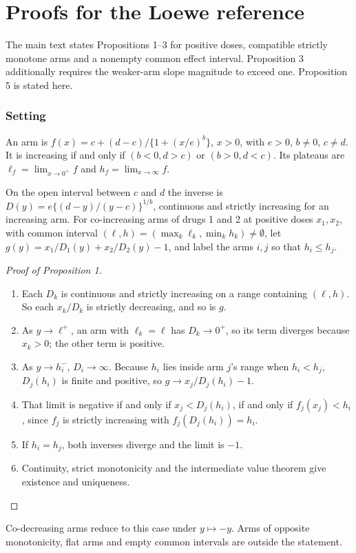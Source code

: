 \documentclass[11pt]{article}
\begin{document}
\section{Proofs for the Loewe reference}\label{sec:S9}
The main text states Propositions 1--3 for positive doses, compatible strictly monotone arms and a nonempty common effect interval. Proposition 3 additionally requires the weaker-arm slope magnitude to exceed one. Proposition 5 is stated here.
\subsubsection*{Setting} An arm is $f(x)=c+(d-c)/\{1+(x/e)^b\}$, $x>0$, with $e>0$, $b\neq0$, $c\neq d$. It is increasing if and only if $(b<0,d>c)$ or $(b>0,d<c)$. Its plateaus are $\ell_f=\lim_{x\to0^+}f$ and $h_f=\lim_{x\to\infty}f$.

On the open interval between $c$ and $d$ the inverse is $D(y)=e\{(d-y)/(y-c)\}^{1/b}$, continuous and strictly increasing for an increasing arm. For co-increasing arms of drugs 1 and 2 at positive doses $x_1,x_2$, with common interval $(\ell,h)=(\max_k\ell_k,\min_kh_k)\neq\emptyset$, let $g(y)=x_1/D_1(y)+x_2/D_2(y)-1$, and label the arms $i,j$ so that $h_i\le h_j$.

\begin{proof}[Proof of Proposition 1]
\begin{enumerate}
\item Each $D_k$ is continuous and strictly increasing on a range containing $(\ell,h)$. So each $x_k/D_k$ is strictly decreasing, and so is $g$.
\item As $y\to\ell^+$, an arm with $\ell_k=\ell$ has $D_k\to0^+$, so its term diverges because $x_k>0$; the other term is positive.
\item As $y\to h_i^-$, $D_i\to\infty$. Because $h_i$ lies inside arm $j$'s range when $h_i<h_j$, $D_j(h_i)$ is finite and positive, so $g\to x_j/D_j(h_i)-1$.
\item That limit is negative if and only if $x_j<D_j(h_i)$, if and only if $f_j(x_j)<h_i$, since $f_j$ is strictly increasing with $f_j(D_j(h_i))=h_i$.
\item If $h_i=h_j$, both inverses diverge and the limit is $-1$.
\item Continuity, strict monotonicity and the intermediate value theorem give existence and uniqueness.\qedhere
\end{enumerate}
\end{proof}
Co-decreasing arms reduce to this case under $y\mapsto-y$. Arms of opposite monotonicity, flat arms and empty common intervals are outside the statement.
\end{document}
